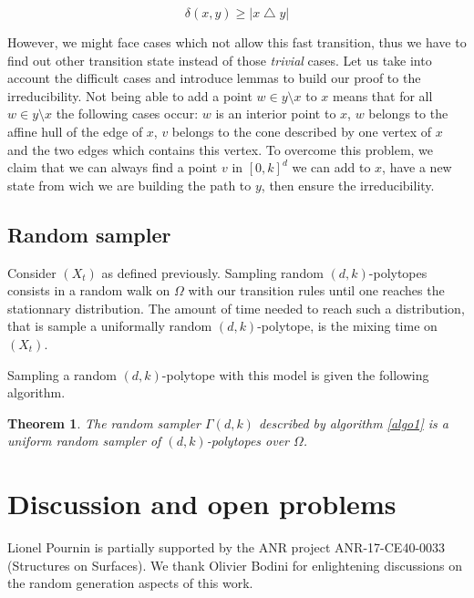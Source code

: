 \documentclass[a4paper]{article}
\newtheorem{theorem}{Theorem}
\begin{document}
\begin{equation}  \delta(x,y) \geq{|x \bigtriangleup y|}
\end{equation}

However, we might face cases which not allow this fast transition, thus we have to find out other transition state instead of those \textit{trivial} cases. Let us take into account the difficult cases and introduce lemmas to build our proof to the irreducibility. Not being able to add a point $w \in y \setminus x$ to $x$ means that for all $w \in y \setminus x$ the following cases occur: $w$ is an interior point to $x$, $w$ belongs to the affine hull of the edge of $x$, $v$ belongs to the cone described by one vertex of $x$ and the two edges which contains this vertex. To overcome this problem, we claim that we can always find a point $v$ in $[0,k]^d$ we can add to $x$, have a new state from wich we are building the path to $y$, then ensure the irreducibility.

\subsection{Random sampler}

Consider $(X_t)$ as defined previously. Sampling random $(d, k)$-polytopes consists in a random walk on $\Omega$ with our transition rules until one reaches the stationnary distribution. The amount of time needed to reach such a distribution, that is sample a uniformally random $(d, k)$-polytope, is the mixing time on $(X_t)$.

Sampling a random $(d, k)$-polytope with this model is given the following algorithm.

\vspace{0.5cm}



\begin{theorem}\label{thm:random-sampler}
  The random sampler $\Gamma(d,k)$ described by algorithm \ref{algo1} is a uniform random sampler of $(d,k)$-polytopes over $\Omega$.
\end{theorem}

\section{Discussion and open problems}

{ Lionel Pournin is partially supported by the ANR project ANR-17-CE40-0033 (Structures on Surfaces). We thank Olivier Bodini for enlightening discussions on the random generation aspects of this work.}



\end{document}

